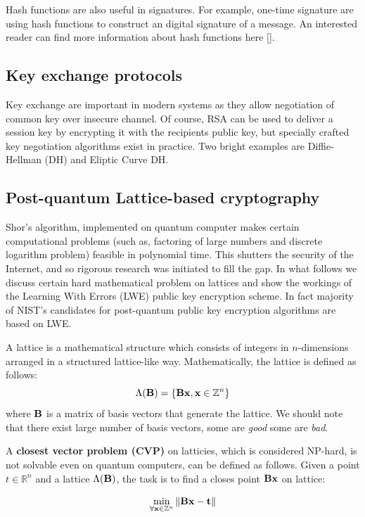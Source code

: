 Hash functions are also useful in signatures. For example, one-time signature are using 
hash functions to construct an digital signature of a message. An interested reader can 
find more information about hash functions here [].

\subsection{Key exchange protocols}

Key exchange are important in modern systems as they allow negotiation of common 
key over insecure channel. Of course, RSA can be used to deliver a session key
by encrypting it with the recipients public key, but specially crafted key negotiation
algorithms exist in practice. Two bright examples are Diffie-Hellman (DH) and Eliptic Curve 
DH. 


\subsection{Post-quantum Lattice-based cryptography}

Shor's algorithm, implemented on quantum computer makes certain computational 
problems (such as, factoring of large numbers and discrete logarithm problem) 
feasible in polynomial time. This shutters the security of the Internet, and 
so rigorous research was initiated to fill the gap. In what follows we discuss
certain hard mathematical problem on lattices and show the workings of the 
Learning With Errors (LWE) public key encryption scheme. In fact majority of 
NIST's candidates for post-quantum public key encryption algorithms are based 
on LWE.

A lattice is a mathematical structure which consists of integers in $n$-dimensions 
arranged in a structured lattice-like way. Mathematically, the lattice is defined as follows:
$$\Lambda({\bf B}) = \{{\bf Bx}, {\bf x} \in \mathbb{Z}^n \}$$ where ${\bf B}$ is a matrix of basis vectors
that generate the lattice. We should note that there exist large number of basis vectors, some are {\it good}
some are {\it bad}.

A { \bf closest vector problem (CVP) } on latticies, which is considered NP-hard, is not solvable even on 
quantum computers, can be defined as follows. Given a point $t \in \mathbb{R}^n$ and a lattice
$\Lambda({\bf B})$, the task is to find a closes point ${\bf Bx}$ on lattice: 

$$\min_{\forall {\bf x} \in \mathbb{Z}^n} \|{\bf Bx} - {\bf t}\|$$ 

